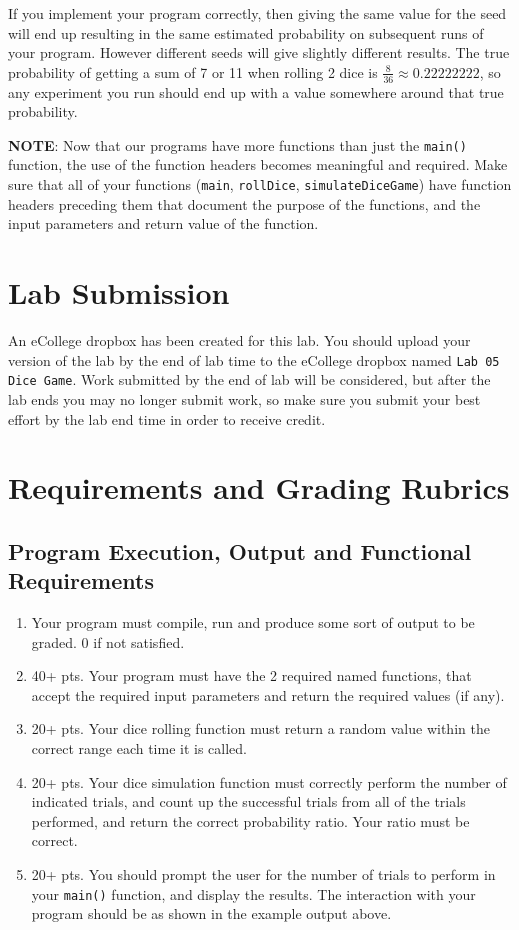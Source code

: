 \documentclass[11pt]{article}
\begin{document}
If you implement your program correctly, then giving the same value
for the seed will end up resulting in the same estimated probability
on subsequent runs of your program.  However different seeds will give
slightly different results.  The true probability of getting a sum of
7 or 11 when rolling 2 dice is $\frac{8}{36} \approx 0.22222222$, so
any experiment you run should end up with a value somewhere around
that true probability.

\textbf{NOTE}: Now that our programs have more functions than just the
\verb~main()~ function, the use of the function headers becomes meaningful
and required.  Make sure that all of your functions (\verb~main~,
\verb~rollDice~, \verb~simulateDiceGame~) have function headers preceding them
that document the purpose of the functions, and the input parameters
and return value of the function.
\section*{Lab Submission}
\label{sec-4}

An eCollege dropbox has been created for this lab.  You should
upload your version of the lab by the end of lab time to the eCollege
dropbox named \verb~Lab 05 Dice Game~.  Work submitted by the end
of lab will be considered, but after the lab ends you may no longer
submit work, so make sure you submit your best effort by the lab end
time in order to receive credit.
\section*{Requirements and Grading Rubrics}
\label{sec-5}

\subsection*{Program Execution, Output and Functional Requirements}
\label{sec-5-1}

\begin{enumerate}
\item Your program must compile, run and produce some sort of output to be
graded. 0 if not satisfied.
\item 40+ pts.  Your program must have the 2 required named functions,
that accept the required input parameters and return the required
values (if any).
\item 20+ pts. Your dice rolling function must return a random value within the
correct range each time it is called.
\item 20+ pts. Your dice simulation function must correctly perform the number of indicated
trials, and count up the successful trials from all of the trials performed,
and return the correct probability ratio.  Your ratio must be correct.
\item 20+ pts. You should prompt the user for the number of trials to
perform in your \verb~main()~ function, and display the results.  The
interaction with your program should be as shown in the example
output above.
\end{enumerate}
\end{document}
